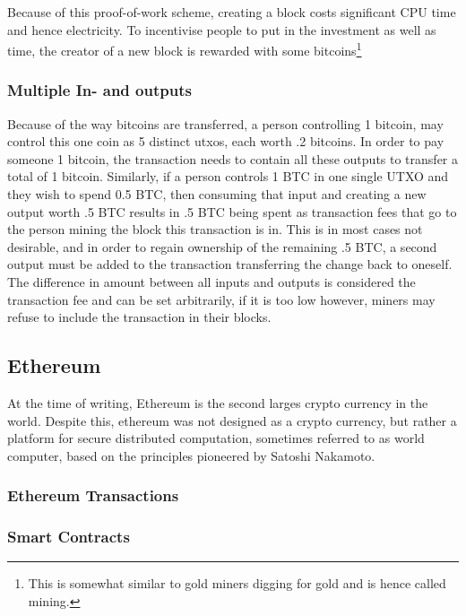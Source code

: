 \documentclass[12pt,msc,a4paper,oneside]{ucl_thesis}
\begin{document}
Because of this proof-of-work scheme, creating a block costs significant CPU time and hence electricity. To incentivise people to put in the investment as well as time, the creator of a new block is rewarded with some bitcoins\footnote{This is somewhat similar to gold miners digging for gold and is hence called mining.} \cite{bitcoin:satoshi}

\subsubsection{Multiple In- and outputs} \label{sec:background_bitcoin:multiple_in_out}
Because of the way bitcoins are transferred, a person controlling 1 bitcoin, may control this one coin as 5 distinct utxos, each worth .2 bitcoins. In order to pay someone 1 bitcoin, the transaction needs to contain all these outputs to transfer a total of 1 bitcoin. Similarly, if a person controls 1 BTC in one single UTXO and they wish to spend 0.5 BTC, then consuming that input and creating a new output worth .5 BTC results in .5 BTC being spent as transaction fees that go to the person mining the block this transaction is in. This is in most cases not desirable, and in order to regain ownership of the remaining .5 BTC, a second output must be added to the transaction transferring the change back to oneself. The difference in amount between all inputs and outputs is considered the transaction fee and can be set arbitrarily, if it is too low however, miners may refuse to include the transaction in their blocks. \cite{bitcoin:satoshi}


\subsection{Ethereum} \label{sec:background_ethereum}
At the time of writing, Ethereum is the second larges crypto currency in the world. Despite this, ethereum was not designed as a crypto currency, but rather a platform for secure distributed computation, sometimes referred to as world computer, based on the principles pioneered by Satoshi Nakamoto.
\subsubsection{Ethereum Transactions}
\subsubsection{Smart Contracts}
\end{document}
